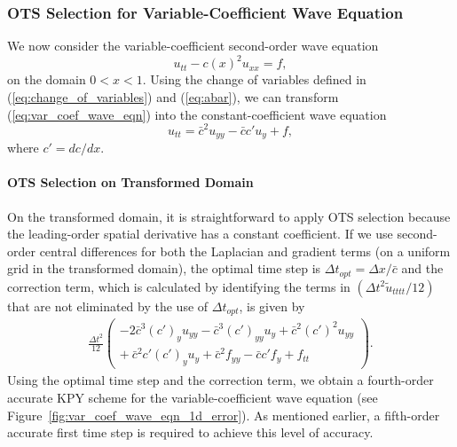 \documentclass[twocolumn]{article} %
\newcommand{\beq}{\begin{equation}}
\newcommand{\eeq}{\end{equation}}
\newcommand{\bea}{\begin{eqnarray}}
\newcommand{\eea}{\end{eqnarray}}
\def\tu{\tilde{u}}
\def\cbar{\bar{c}}
\def\dt{\Delta t}
\def\dx{\Delta x}
\begin{document}
\subsubsection*{OTS Selection for Variable-Coefficient Wave Equation}
We now consider the variable-coefficient second-order wave equation
\beq
    u_{tt} - c(x)^2 u_{xx} = f,
    \label{eq:var_coef_wave_eqn}
\eeq
on the domain $0 < x < 1$.  Using the change of variables defined in 
(\ref{eq:change_of_variables}) and (\ref{eq:abar}), we can transform 
(\ref{eq:var_coef_wave_eqn}) into the constant-coefficient wave equation
\beq
  u_{tt} = \cbar^2 u_{yy} - \cbar c' u_y + f,
\eeq
where $c' = dc/dx$.


\paragraph*{OTS Selection on Transformed Domain}
On the transformed domain, it is straightforward to apply OTS selection 
because the leading-order spatial derivative has a constant coefficient.  
If we use second-order central differences for both the Laplacian and gradient 
terms (on a uniform grid in the transformed domain), the optimal time step is 
$\dt_{opt} = \dx/\cbar$ and the correction term, which is calculated by 
identifying the terms in $\left(\dt^2 \tu_{tttt}/12\right)$ that are not 
eliminated by the use of $\dt_{opt}$, is given by
\bea
  \frac{\dt^2}{12} 
  \left(
    \begin{array}{l}
        -2 \cbar^3 (c')_y u_{yy}
        -\cbar^3 (c')_{yy} u_{y}
        + \cbar^2 (c')^2 u_{yy} 
        \\
        +\ \cbar^2 c' (c')_y u_{y}
        + \cbar^2 f_{yy}
        - \cbar c' f_y
        + f_{tt}
    \end{array}
  \right).
\eea
Using the optimal time step and the correction term, we obtain a fourth-order
accurate KPY scheme for the variable-coefficient wave equation 
(see Figure~\ref{fig:var_coef_wave_eqn_1d_error}).  As mentioned earlier,
a fifth-order accurate first time step is required to achieve this level of
accuracy.
\end{document}
